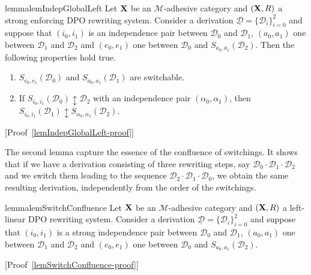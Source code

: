 \documentclass[a4paper,UKenglish,cleveref,pdftex,thm-restate,numberwithinsect,anonymous]{lipics}
\def\R{\mathsf{R}}
\def\X{\textbf {\textup{X}}}
\newcommand{\dder}[1]{\mathscr{#1}}
\newcommand{\der}[1]{\underline{\dder{#1}}}
\newcommand{\seqind}{\ensuremath{\updownarrow}}
\begin{document}
\begin{restatable}{lemma}{lemIndepGlobalLeft}
  \label{lem:indep-global-left}
  Let $\X$ be an $\mathcal{M}$-adhesive category and
  $(\X,\R)$ a strong enforcing DPO rewriting system.
  Consider a derivation
  $\der{D}=\{\dder{D}_i\}_{i=0}^2$ and suppose that $(i_0,i_1)$ is an independence pair between $\dder{D}_0$ and $\dder{D}_1$,
  $(a_0,a_1)$ one between $\dder{D}_1$ and $\dder{D}_2$ and
  $(e_0, e_1)$ one between $\dder{D}_0$ and
  $S_{a_0,a_1}(\dder{D}_2)$. Then the following properties hold true.
  \begin{enumerate}
  \item
    \label{lem:indep-global-left:1}
    $S_{e_0,e_1}(\dder{D}_0)$ and $S_{a_0,a_1}(\dder{D}_1)$ are
    switchable.
    
  \item
    \label{lem:indep-global-left:2}
    If $S_{i_0, i_1}(\dder{D}_0)\seqind \dder{D}_2$ with an independence pair $(\alpha_0, \alpha_1)$, then
    $S_{i_0,i_1}(\dder{D}_1)\seqind S_{\alpha_0, \alpha_1}(\dder{D}_2)$.
  \end{enumerate}
\end{restatable}


[Proof~\ref{lemIndepGlobalLeft-proof}]


The second lemma capture the essence of the confluence of
switchings. It shows that if we have a derivation consisting of three
rewriting steps, say $\dder{D}_0\cdot \dder{D}_1\cdot  \dder{D}_2$ and we switch them leading to the
sequence $\dder{D}_2\cdot  \dder{D}_1\cdot  \dder{D}_0$, we obtain the same resulting derivation,
independently from the order of the switchings.


\begin{restatable}{lemma}{lemSwitchConfluence}
	\label{lem:switch-confluence}
	Let $\X$ be an $\mathcal{M}$-adhesive category and $(\X,\R)$ a
	left-linear DPO rewriting system.
	Consider a derivation $\der{D}=\{\dder{D}_i\}_{i=0}^2$ and suppose
	that $(i_0,i_1)$ is a strong independence pair between $\dder{D}_0$
	and $\dder{D}_1$, $(a_0,a_1)$ one between $\dder{D}_1$ and
	$\dder{D}_2$ and $(e_0, e_1)$ one between $\dder{D}_0$ and
	$S_{a_0,a_1}(\dder{D}_2)$.
\end{restatable}

[Proof~\ref{lemSwitchConfluence-proof}]
\end{document}
